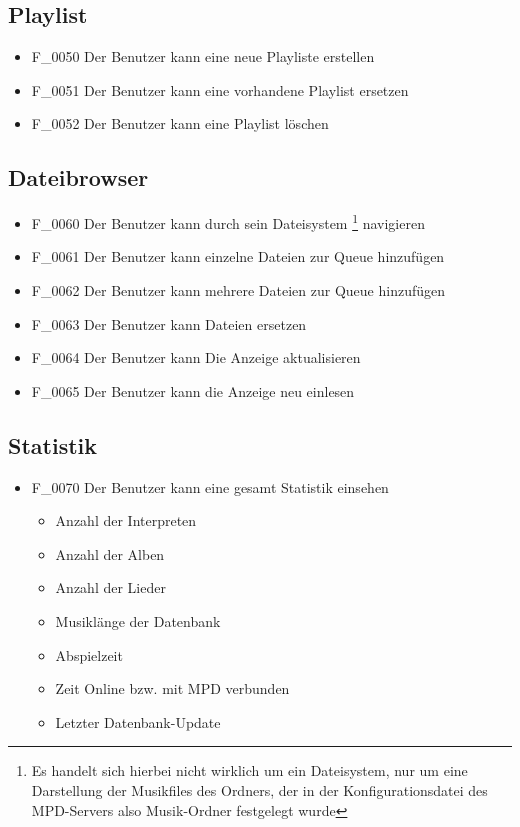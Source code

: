 \subsection{Playlist}
\begin{itemize}
	\item F\_0050 Der Benutzer kann eine neue Playliste erstellen
	\item F\_0051 Der Benutzer kann eine vorhandene Playlist ersetzen
	\item F\_0052 Der Benutzer kann eine Playlist löschen
\end{itemize}
\subsection{Dateibrowser}
\begin{itemize}
	\item F\_0060 Der Benutzer kann durch sein Dateisystem \footnote{Es handelt sich hierbei nicht wirklich um ein Dateisystem, nur um eine Darstellung der Musikfiles des Ordners, der in der Konfigurationsdatei des MPD-Servers also Musik-Ordner festgelegt wurde} navigieren
	\item F\_0061 Der Benutzer kann einzelne Dateien zur Queue hinzufügen
	\item F\_0062 Der Benutzer kann mehrere Dateien zur Queue hinzufügen
	\item F\_0063 Der Benutzer kann Dateien ersetzen
	\item F\_0064 Der Benutzer kann Die Anzeige aktualisieren
	\item F\_0065 Der Benutzer kann die Anzeige neu einlesen
\end{itemize}
\subsection{Statistik}
\begin{itemize}
	\item F\_0070 Der Benutzer kann eine gesamt Statistik einsehen
	\begin{itemize}
		\item Anzahl der Interpreten
		\item Anzahl der Alben
		\item Anzahl der Lieder
		\item Musiklänge der Datenbank
		\item Abspielzeit	
		\item Zeit Online bzw. mit MPD verbunden
		\item Letzter Datenbank-Update
	\end{itemize}
\end{itemize}
